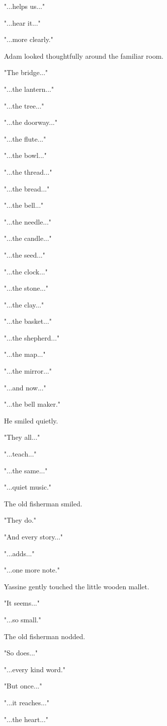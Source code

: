 \documentclass[12pt,openany]{book}
\begin{document}
"...helps us..."

"...hear it..."

"...more clearly."

Adam looked thoughtfully around the familiar room.

"The bridge..."

"...the lantern..."

"...the tree..."

"...the doorway..."

"...the flute..."

"...the bowl..."

"...the thread..."

"...the bread..."

"...the bell..."

"...the needle..."

"...the candle..."

"...the seed..."

"...the clock..."

"...the stone..."

"...the clay..."

"...the basket..."

"...the shepherd..."

"...the map..."

"...the mirror..."

"...and now..."

"...the bell maker."

He smiled quietly.

"They all..."

"...teach..."

"...the same..."

"...quiet music."

The old fisherman smiled.

"They do."

"And every story..."

"...adds..."

"...one more note."

Yassine gently touched the little wooden mallet.

"It seems..."

"...so small."

The old fisherman nodded.

"So does..."

"...every kind word."

"But once..."

"...it reaches..."

"...the heart..."
\end{document}
